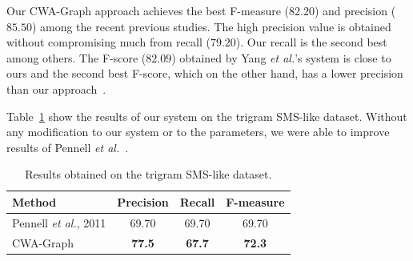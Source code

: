 \documentclass[a4paper,onesided,12pt]{report}
\begin{document}
Our CWA-Graph approach achieves the best F-measure ($82.20$) and precision ($85.50$) among the recent previous studies. The high precision value is obtained without compromising much from recall ($79.20$). Our recall is the second best among others. The F-score ($82.09$) obtained by Yang \textit{et al.}'s system is close to ours and the second best F-score, which on the other hand, has a lower precision than our approach~\cite{DBLP:conf/emnlp/YangE13}.


Table~\ref{tab:resultspennell} show the results of our system on the trigram SMS-like dataset. Without any modification to our system or to the parameters, we were able to improve results of Pennell \textit{et al.}~\cite{pennell2011character}.

\begin{table}[thb]
  \caption{Results obtained on the trigram SMS-like dataset.}
  \centering
  \begin{tabular}[t]{|l|c|c|c|}
    \hline
    \textbf{Method} & \textbf{Precision} & \textbf{Recall} & \textbf{F-measure} \\
    \hline
    Pennell \textit{et al.}, 2011 & 69.70 & 69.70 & 69.70 \\\hline
    CWA-Graph   &  \textbf{77.5} & \textbf{67.7}  &  \textbf{72.3} \\\hline
  \end{tabular}
  \label{tab:resultspennell}
\end{table}
\end{document}
